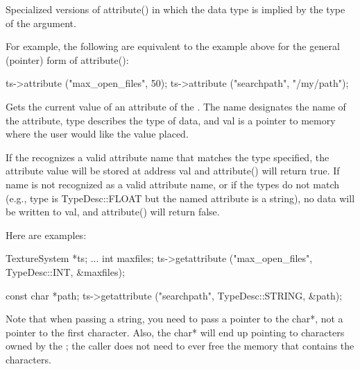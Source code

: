 \apiend

Specialized versions of {\cf attribute()} in which the data type is
implied by the type of the argument.

For example, the following are equivalent to the example above for the
general (pointer) form of {\cf attribute()}:

\begin{code}
      ts->attribute ("max_open_files", 50);
      ts->attribute ("searchpath", "/my/path");
\end{code}

\apiend



Gets the current value of an attribute of the \TextureSystem.
The {\cf name} designates the name of the attribute, {\cf type}
describes the type of data, and {\cf val} is a pointer to memory 
where the user would like the value placed.

If the \TextureSystem recognizes a valid attribute name that matches the
type specified, the attribute value will be stored at address {\cf val}
and {\cf attribute()} will return {\cf true}.  If {\cf name} is not recognized
as a valid attribute name, or if the types do not match (e.g., {\cf
  type} is {\cf TypeDesc::FLOAT} but the named attribute is a string),
no data will be written to {\cf val}, and {\cf attribute()} will return
{\cf false}.

Here are examples:

\begin{code}
      TextureSystem *ts; 
      ...
      int maxfiles;
      ts->getattribute ("max_open_files", TypeDesc::INT, &maxfiles);

      const char *path;
      ts->getattribute ("searchpath", TypeDesc::STRING, &path);
\end{code}

Note that when passing a string, you need to pass a pointer to the {\cf
  char*}, not a pointer to the first character.  Also, the {\cf char*}
will end up pointing to characters owned by the \TextureSystem; the
caller does not need to ever free the memory that contains the
characters.

